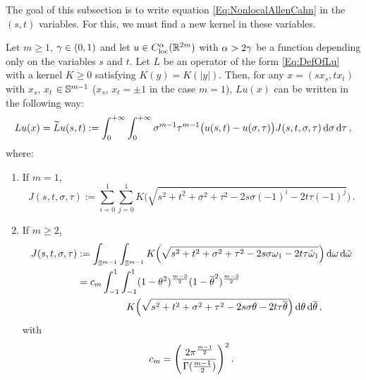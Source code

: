 The goal of this subsection is to write equation \eqref{Eq:NonlocalAllenCahn} in the $(s,t)$ variables. For this, we must find a new kernel in these variables.

\begin{lemma}
\label{Lemma:OperatorInSTVariables}
Let $m \geq 1$, $\gamma\in(0,1)$ and let $u\in C_{\mathrm{loc}}^\alpha(\mathbb{R}^{2m})$ with $\alpha > 2\gamma$ be a function depending only on the variables $s$ and $t$. Let $L$ be an operator of the form \eqref{Eq:DefOfLu} with a kernel $K\geq 0$ satisfying $K(y) = K(|y|)$. Then, for any $x = (s x_s, t x_t)$ with $x_s$, $x_t$ $\in \mathbb{S}^{m-1}$ ($x_s$, $x_t = \pm 1$ in the case $m=1$),  $Lu(x)$ can be written in the following way:
\begin{equation}
\label{Eq:OperatorInSTVariables}
Lu(x) = \widetilde{L} u (s,t) := \int_0^{+\infty}  \int_0^{+\infty} \sigma^{m-1} \tau^{m-1} \big(u(s,t) - u(\sigma, \tau)\big) J(s,t,\sigma, \tau)  \,\mathrm{d} \sigma\,\mathrm{d} \tau\,,
\end{equation}
where:
\begin{enumerate}
	\item If $m= 1$,
	\begin{equation}
		\label{Eq:KernelInSTVariablesR2}
	J(s,t,\sigma, \tau) := \sum_{i=0}^1  \sum_{j =0}^1  K\Big(\sqrt{s^2 + t^2 + \sigma^2 + \tau^2 -2 s \sigma (-1)^i -2 t \tau (-1)^j}\Big)\,.
	\end{equation}
	
	\item If $m\geq 2$,
	\begin{align}
	J(s,t,\sigma, \tau) &:= \int_{\mathbb{S}^{m-1}}  \int_{\mathbb{S}^{m-1}}  K\Big(\sqrt{s^2 + t^2 + \sigma^2 + \tau^2 -2 s \sigma \omega_1 -2 t \tau \tilde{\omega}_1}\Big) \,\mathrm{d} \omega \,\mathrm{d} \tilde{\omega}  \label{Eq:KernelSTVariables1}\\
	&= c_m \int_{-1}^1  \int_{-1}^1  (1-\theta^2)^{\frac{m-3}{2}} (1-\overline{\theta}^2)^{\frac{m-3}{2}} \nonumber\\
	& \quad \quad \quad \quad \quad
	K\Big(\sqrt{s^2 + t^2 + \sigma^2 + \tau^2 -2 s \sigma \theta -2 t \tau \overline{\theta}}\Big) \,\mathrm{d} \theta \,\mathrm{d} \overline{\theta}\,, \label{Eq:KernelSTVariables2}
	\end{align}
	with
	$$
	c_m = \left ( {\dfrac{2 \pi^{\frac{m-1}{2}}}{\Gamma (\frac{m-1}{2})}}\right )^2.
	$$
\end{enumerate}
\end{lemma}


